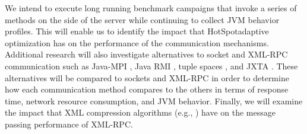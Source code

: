 \documentclass{sig-alternate}
\begin{document}
We intend to execute long running benchmark campaigns that invoke a
series of methods on the side of the server while continuing to
collect JVM behavior profiles.  This will enable us to identify the
impact that HotSpot\texttrademark adaptive optimization has on the
performance of the communication mechanisms.  Additional research will
also investigate alternatives to socket and XML-RPC communication such
as Java-MPI \cite{getov-mpi,judd-mpi-java}, Java RMI
\cite{grosso-rmi,maasen-java-rmi}, tuple spaces
\cite{arnold-javaspace-rdb,fiedler-settle-sigmetrics-per,wells-linda-java-journal},
and JXTA \cite{oaks-jxta,seigneur-jxta}.  These alternatives will be
compared to sockets and XML-RPC in order to determine how each
communication method compares to the others in terms of response time,
network resource consumption, and JVM behavior. Finally, we will
examine the impact that XML compression algorithms (e.g.,
\cite{min-xpress}) have on the message passing performance of XML-RPC.









\end{document}
